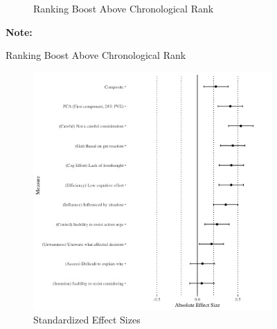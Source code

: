 \documentclass[12pt,letterpaper]{article}
\begin{document}
\begin{figure}[ht]
\begin{subfigure}{.5\textwidth}
        \caption{Ranking Boost Above Chronological Rank}
        \label{fig:pymk_rankingboost}
    \end{subfigure}
\footnotesize \textbf{Note:} 
\end{figure}


\begin{figure}
\caption{Deliberateness}
  \begin{subfigure}{.5\textwidth} 
        \centering
        \includegraphics[width=1\linewidth]{Output/Graphs/Experiments/Automaticity/standardized effect sizes.jpg} 
        \caption{Standardized Effect Sizes}
        \label{fig:auto_effsize}
    \end{subfigure}
    \begin{subfigure}{.5\textwidth} 
        \centering

\end{subfigure}
\end{figure}
\end{document}

